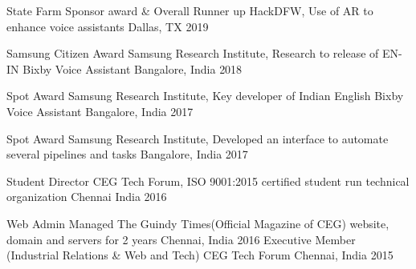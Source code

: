 



\begin{cvhonors}

  \cvhonor
    {State Farm Sponsor award \& Overall Runner up} %
    {HackDFW, Use of AR to enhance voice assistants} %
    {Dallas, TX} %
    {2019} %


  \cvhonor
    {Samsung Citizen Award} %
    {Samsung Research Institute, Research to release of EN-IN Bixby Voice Assistant} %
    {Bangalore, India} %
    {2018} %

  \cvhonor
    {Spot Award} %
    {Samsung Research Institute, Key developer of Indian English Bixby Voice Assistant} %
    {Bangalore, India} %
    {2017} %

  \cvhonor
    {Spot Award} %
    {Samsung Research Institute, Developed an interface to automate several pipelines and tasks} %
    {Bangalore, India} %
    {2017} %

  \cvhonor
    {Student Director} %
    {CEG Tech Forum, ISO 9001:2015 certified student run technical organization} %
    {Chennai India} %
    {2016} %

  \cvhonor
  {Web Admin} %
  {Managed The Guindy Times(Official Magazine of CEG) website, domain and servers for 2 years} %
  {Chennai, India} %
  {2016} %
%
  \cvhonor
    {Executive Member (Industrial Relations \& Web and Tech)} %
    {CEG Tech Forum} %
    {Chennai, India} %
    {2015} %
%
\end{cvhonors}
